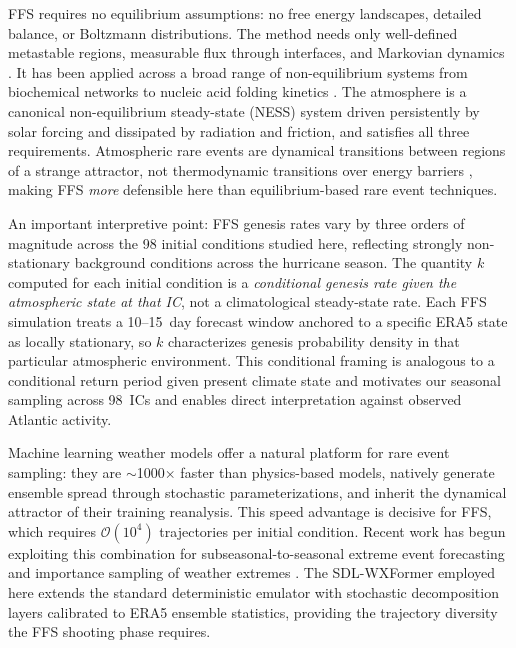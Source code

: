 \documentclass[11pt]{article}
\begin{document}
FFS requires no equilibrium assumptions: no free energy landscapes, detailed balance,
or Boltzmann distributions. The method needs only well-defined metastable regions,
measurable flux through interfaces, and Markovian dynamics \citep{allen2009forward}.
It has been applied across a broad range of non-equilibrium systems from
biochemical networks \citep{allen2005sampling} to nucleic acid folding kinetics
\citep{schreck2015dna}. The atmosphere is a canonical non-equilibrium steady-state
(NESS) system driven persistently by solar forcing and dissipated by radiation
and friction, and satisfies all three requirements. Atmospheric rare events are
dynamical transitions between regions of a strange attractor, not thermodynamic
transitions over energy barriers \citep{touchette2009large}, making FFS \textit{more}
defensible here than equilibrium-based rare event techniques.

An important interpretive point: FFS genesis rates vary by three orders of magnitude
across the 98 initial conditions studied here, reflecting strongly non-stationary
background conditions across the hurricane season. The quantity $k$ computed for each
initial condition is a \textit{conditional genesis rate given the atmospheric state at
that IC}, not a climatological steady-state rate. Each FFS simulation treats a
10--15~day forecast window anchored to a specific ERA5 state as locally stationary,
so $k$ characterizes genesis probability density in that particular atmospheric
environment. This conditional framing is analogous to a conditional return period
given present climate state \citep{finkel2023revealing,finkel2024bringing} and motivates
our seasonal sampling across 98~ICs and enables direct interpretation against observed
Atlantic activity.

Machine learning weather models \citep{lam2023graphcast,bi2023pangu,pathak2022fourcastnet}
offer a natural platform for rare event sampling: they are $\sim$1000$\times$ faster
than physics-based models, natively generate ensemble spread through stochastic
parameterizations, and inherit the dynamical attractor of their training reanalysis.
This speed advantage is decisive for FFS, which requires $\mathcal{O}(10^4)$ trajectories
per initial condition. Recent work has begun exploiting this combination for
subseasonal-to-seasonal extreme event forecasting \citep{mu2025skillful} and importance
sampling of weather extremes \citep{lancelin2025ai}. The SDL-WXFormer \citep{schreck2025sdl}
employed here extends the standard deterministic emulator with stochastic decomposition
layers calibrated to ERA5 ensemble statistics, providing the trajectory diversity
the FFS shooting phase requires.
\end{document}
